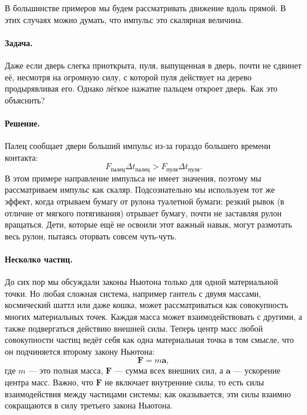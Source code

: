 В большинстве примеров мы будем рассматривать движение вдоль прямой.
В этих случаях можно думать, что импульс это скалярная величина.

\paragraph{Задача.}
Даже если дверь слегка приоткрыта, пуля, выпущенная
в дверь, почти не сдвинет её, несмотря на огромную силу, с которой пуля действует на дерево продырявливая его.
Однако лёгкое нажатие пальцем откроет дверь.
Как это объяснить?

\paragraph{Решение.}
Палец сообщает двери больший импульс
из-за гораздо большего времени контакта:
\[
F_{\text{палец}}  \Delta t_{\text{палец}}
>
F_{\text{пуля}}  \Delta t_{\text{пуля}}.
\]
В этом примере направление импульса не имеет значения, поэтому мы рассматриваем импульс как скаляр.
Подсознательно мы используем тот же эффект, когда отрываем бумагу от рулона туалетной бумаги: резкий рывок (в отличие от мягкого потягивания) отрывает бумагу, почти не заставляя
рулон вращаться.
Дети, которые ещё не освоили этот важный навык, могут размотать весь рулон, пытаясь оторвать совсем чуть-чуть.

\paragraph{Несколко частиц.}
До сих пор мы обсуждали законы Ньютона
только для одной материальной точки.
Но любая сложная система, например гантель с двумя массами, космический шаттл или даже кошка,
может рассматриваться как совокупность многих материальных точек.
Каждая масса может взаимодействовать с другими, а также подвергаться
действию внешней силы.
Теперь центр масс любой совокупности частиц ведёт себя как одна
материальная точка в том смысле, что он подчиняется второму закону Ньютона:
\begin{equation}
    \mathbf{F} = m \mathbf{a},
    \label{eq:A.11}
\end{equation}
где $m$ — это полная масса, $\mathbf{F}$ — сумма всех внешних сил,
а $\mathbf{a}$ — ускорение центра масс.
Важно, что $\mathbf{F}$ не включает внутренние силы, то есть силы
взаимодействия между частицами системы; как оказывается, эти силы
взаимно сокращаются в силу третьего закона Ньютона.

